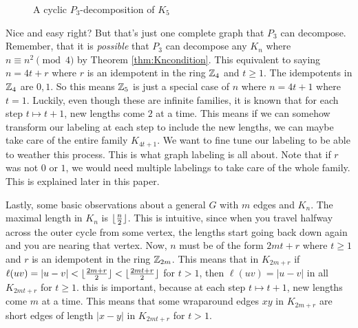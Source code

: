 \begin{figure}[H]
\begin{center}
  \end{center}
  \caption{A cyclic $P_{3}$-decomposition of $K_{5}$}
  \label{fig:P3K5colordecomp}
\end{figure}

Nice and easy right? But that's just one complete graph that $P_{3}$ can decompose. Remember, that it is \textit{possible} that $P_{3}$ can decompose any $K_{n}$ where $n\equiv n^{2} \pmod{4}$ by Theorem \ref{thm:Kncondition}. This equivalent to saying $n=4t+r$ where $r$ is an idempotent in the ring $\mathbb{Z}_{4}$ and $t\geq 1$. The idempotents in $\mathbb{Z}_{4}$ are $0,1$. So this means $\mathbb{Z}_{5}$ is just a special case of $n$ where $n=4t+1$ where $t=1$. Luckily, even though these are infinite families, it is known that for each step $t\mapsto t+1$, new lengths come $2$ at a time. This means if we can somehow transform our labeling at each step to include the new lengths, we can maybe take care of the entire family $K_{4t+1}$. We want to fine tune our labeling to be able to weather this process. This is what graph labeling is all about. Note that if $r$ was not $0$ or $1$, we would need multiple labelings to take care of the whole family. This is explained later in this paper.

Lastly, some basic observations about a general $G$ with $m$ edges and $K_{n}$. The maximal length in $K_{n}$ is $\lfloor\frac{n}{2}\rfloor$. This is intuitive, since when you travel halfway across the outer cycle from some vertex, the lengths start going back down again and you are nearing that vertex. Now, $n$ must be of the form $2mt+r$ where $t\geq 1$ and $r$ is an idempotent in the ring $\mathbb{Z}_{2m}$. This means that in $K_{2m+r}$ if $\ell(uv)=|u-v|<\lfloor\frac{2m+r}{2}\rfloor<\lfloor\frac{2mt+r}{2}\rfloor$ for $t>1$, then $\ell(uv)=|u-v|$ in all $K_{2mt+r}$ for $t\geq 1$. this is important, because at each step $t\mapsto t+1$, new lengths come $m$ at a time. This means that some wraparound edges $xy$ in $K_{2m+r}$ are short edges of length $|x-y|$ in $K_{2mt+r}$ for $t>1$.

